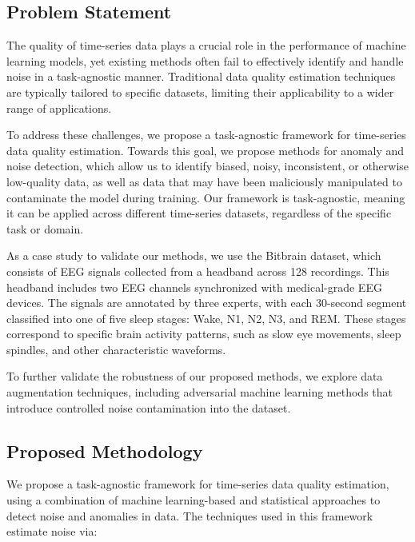 
\subsection{Problem Statement}

The quality of time-series data plays a crucial role in the performance of machine learning models, yet existing methods often fail to effectively identify and handle noise in a task-agnostic manner. Traditional data quality estimation techniques are typically tailored to specific datasets, limiting their applicability to a wider range of applications. 

To address these challenges, we propose a task-agnostic framework for time-series data quality estimation. Towards this goal, we propose methods for anomaly and noise detection, which allow us to identify biased, noisy, inconsistent, or otherwise low-quality data, as well as data that may have been maliciously manipulated to contaminate the model during training. Our framework is task-agnostic, meaning it can be applied across different time-series datasets, regardless of the specific task or domain.

As a case study to validate our methods, we use the Bitbrain dataset, which consists of EEG signals collected from a headband across 128 recordings. This headband includes two EEG channels synchronized with medical-grade EEG devices. The signals are annotated by three experts, with each 30-second segment classified into one of five sleep stages: Wake, N1, N2, N3, and REM. These stages correspond to specific brain activity patterns, such as slow eye movements, sleep spindles, and other characteristic waveforms.

To further validate the robustness of our proposed methods, we explore data augmentation techniques, including adversarial machine learning methods that introduce controlled noise contamination into the dataset.

\subsection{Proposed Methodology}

We propose a task-agnostic framework for time-series data quality estimation, using a combination of machine learning-based and statistical approaches to detect noise and anomalies in data. The techniques used in this framework estimate noise via:

